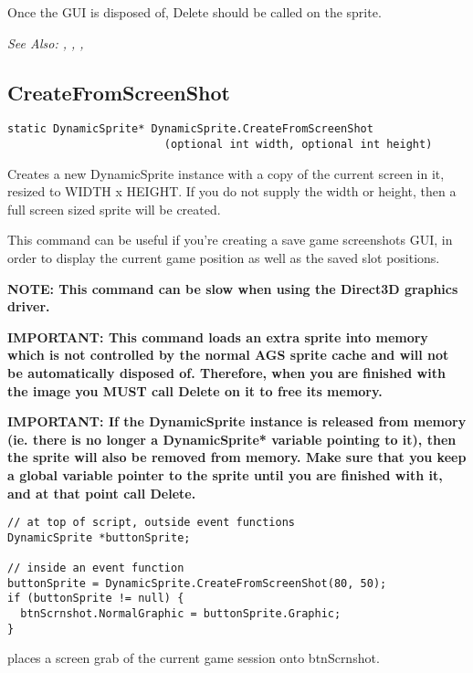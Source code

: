 Once the GUI is disposed of, Delete should be called on the sprite.

\it{See Also:} ,
,
,


\subsection{CreateFromScreenShot}\label{DynamicSprite.CreateFromScreenShot}%

\begin{verbatim}
static DynamicSprite* DynamicSprite.CreateFromScreenShot
                        (optional int width, optional int height)
\end{verbatim}
Creates a new DynamicSprite instance with a copy of the current screen in it,
resized to WIDTH x HEIGHT. If you do not supply the width or height, then a full screen
sized sprite will be created.

This command can be useful if you're creating a save game screenshots GUI, in order to
display the current game position as well as the saved slot positions.

\bf{NOTE:} This command can be slow when using the Direct3D graphics driver.

\bf{IMPORTANT:} This command loads an extra sprite into memory which is not controlled
by the normal AGS sprite cache and will not be automatically disposed of. Therefore, when
you are finished with the image you \bf{MUST} call Delete on it to free its memory.

\bf{IMPORTANT:} If the DynamicSprite instance is released from memory (ie. there is
no longer a DynamicSprite* variable pointing to it), then the sprite will also be
removed from memory. Make sure that you keep a global variable pointer to the sprite
until you are finished with it, and at that point call Delete.

\begin{verbatim}
// at top of script, outside event functions
DynamicSprite *buttonSprite;

// inside an event function
buttonSprite = DynamicSprite.CreateFromScreenShot(80, 50);
if (buttonSprite != null) {
  btnScrnshot.NormalGraphic = buttonSprite.Graphic;
}
\end{verbatim}
places a screen grab of the current game session onto btnScrnshot.

